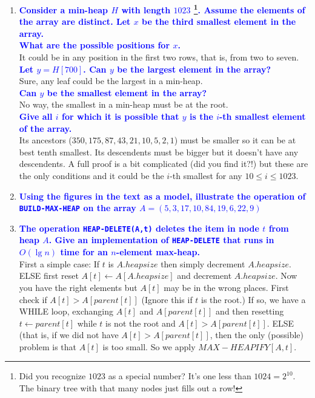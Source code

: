\documentclass[11pt]{article}
\begin{document}
\begin{enumerate}
\item \textbf{\textcolor{blue}{Consider a min-heap $H$ with length $1023$
\footnote{Did you recognize $1023$ as a special number? It's one less 
than $1024=2^{10}$. The binary tree with that many nodes just fills 
out a row!}.
Assume the elements of the array are distinct. Let $x$ be the third 
smallest element in the array.}}
\\ \textbf{\textcolor{blue}{What are the possible positions for $x$.}}
    \\ It could be in any position in the first two rows, that is, from
    two to seven.
\\ \textbf{\textcolor{blue}{Let $y=H[700]$. Can $y$ be the largest element in the array?}}
    \\ Sure, any leaf could be the largest in a min-heap.
\\ \textbf{\textcolor{blue}{Can $y$ be the smallest element in the array?}}
    \\ No way, the smallest in a min-heap must be at the root.
\\ \textbf{\textcolor{blue}{Give all $i$ for which it is possible that $y$ 
                            is the $i$-th smallest element of the array.}}
    \\ Its ancestors ($350,175,87,43,21,10,5,2,1$) must be smaller
       so it can be at best tenth smallest.  Its descendents must be
       bigger but it doesn't have any descendents.  A full proof is
       a bit complicated (did you find it?!) but these are the only
       conditions and it could be the $i$-th smallest for any 
       $10\leq i\leq 1023$.

\item \textbf{\textcolor{blue}{Using the figures in the text as a model, illustrate the operation of
{\tt BUILD-MAX-HEAP} on the array $A=(5,3,17,10,84,19,6,22,9)$}}

\item \textbf{\textcolor{blue}{The operation {\tt HEAP-DELETE(A,t)} deletes the item in node $t$
from heap $A$.  Give an implementation of {\tt HEAP-DELETE} that runs in
$O(\lg n)$ time for an $n$-element max-heap.}}
    \\ First a simple case: If $t$ is $A.heapsize$ then simply decrement
    $A.heapsize$.  ELSE first reset $A[t]\leftarrow A[A.heapsize]$ and
    decrement $A.heapsize$.  Now you have the right elements but $A[t]$
    may be in the wrong places.  First check if $A[t]> A[parent[t]]$
    (Ignore this if $t$ is the root.)  If so, we have a WHILE loop,
    exchanging $A[t]$ and $A[parent[t]]$ and then resetting $t\leftarrow parent[t]$
    while $t$ is not the root and $A[t]> A[parent[t]]$. ELSE (that is, if
    we did not have $A[t]> A[parent[t]]$, then the only (possible) problem
    is that $A[t]$ is too small.  So we apply $MAX-HEAPIFY[A,t]$.


\end{enumerate}
\end{document}
